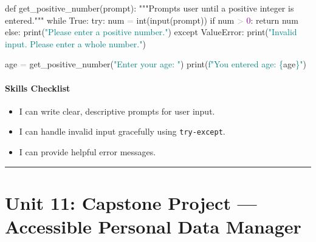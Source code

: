 \documentclass[
  justified,
  openright,
]{tufte-book}
\let\subsubsection\paragraph
\let\paragraph\paragraph
\newcommand{\BuiltInTok}[1]{#1}
\newcommand{\CommentTok}[1]{\textcolor{MidGray}{#1}}
\newcommand{\ControlFlowTok}[1]{\textcolor{BrandBlue}{#1}}
\newcommand{\DecValTok}[1]{\textcolor{Purple}{#1}}
\newcommand{\KeywordTok}[1]{\textcolor{BrandBlue}{#1}}
\newcommand{\NormalTok}[1]{#1}
\newcommand{\OperatorTok}[1]{\textcolor{DarkGray}{#1}}
\newcommand{\PreprocessorTok}[1]{\textcolor{BrandAccent}{#1}}
\newcommand{\SpecialCharTok}[1]{\textcolor{Teal}{#1}}
\newcommand{\SpecialStringTok}[1]{\textcolor{Teal}{#1}}
\newcommand{\StringTok}[1]{\textcolor{Teal}{#1}}
\newcommand{\VariableTok}[1]{#1}
\newenvironment{Shaded}{%
  \begin{snugshade}
}{%
  \end{snugshade}
}
\let\subsubsection\paragraph
\let\paragraph\paragraph
\providecommand{\tightlist}{%
  \setlength{\itemsep}{0pt}\setlength{\parskip}{0pt}}
\begin{document}
\begin{Shaded}
\begin{Highlighting}[]
\KeywordTok{def}\NormalTok{ get\_positive\_number(prompt):}
    \CommentTok{"""Prompts user until a positive integer is entered."""}
    \ControlFlowTok{while} \VariableTok{True}\NormalTok{:}
        \ControlFlowTok{try}\NormalTok{:}
\NormalTok{            num }\OperatorTok{=} \BuiltInTok{int}\NormalTok{(}\BuiltInTok{input}\NormalTok{(prompt))}
            \ControlFlowTok{if}\NormalTok{ num }\OperatorTok{\textgreater{}} \DecValTok{0}\NormalTok{:}
                \ControlFlowTok{return}\NormalTok{ num}
            \ControlFlowTok{else}\NormalTok{:}
                \BuiltInTok{print}\NormalTok{(}\StringTok{"Please enter a positive number."}\NormalTok{)}
        \ControlFlowTok{except} \PreprocessorTok{ValueError}\NormalTok{:}
            \BuiltInTok{print}\NormalTok{(}\StringTok{"Invalid input. Please enter a whole number."}\NormalTok{)}


\NormalTok{age }\OperatorTok{=}\NormalTok{ get\_positive\_number(}\StringTok{"Enter your age: "}\NormalTok{)}
\BuiltInTok{print}\NormalTok{(}\SpecialStringTok{f"You entered age: }\SpecialCharTok{\{}\NormalTok{age}\SpecialCharTok{\}}\SpecialStringTok{"}\NormalTok{)}
\end{Highlighting}
\end{Shaded}

\subsubsection{Skills Checklist}\label{skills-checklist-51}

\begin{itemize}
\tightlist
\item[$\square$]
  I can write clear, descriptive prompts for user input.
\item[$\square$]
  I can handle invalid input gracefully using \texttt{try-except}.
\item[$\square$]
  I can provide helpful error messages.
\end{itemize}

\begin{center}\rule{0.5\linewidth}{0.5pt}\end{center}

\section{Unit 11: Capstone Project --- Accessible Personal Data
Manager}\label{unit-11-capstone-project-accessible-personal-data-manager}
\end{document}

